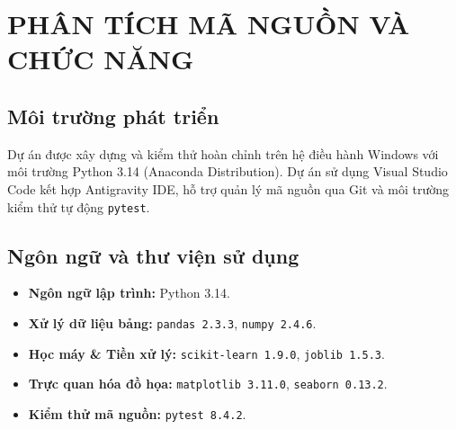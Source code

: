\chapter{PHÂN TÍCH MÃ NGUỒN VÀ CHỨC NĂNG}

\section{Môi trường phát triển}
Dự án được xây dựng và kiểm thử hoàn chỉnh trên hệ điều hành Windows với môi trường Python 3.14 (Anaconda Distribution). Dự án sử dụng Visual Studio Code kết hợp Antigravity IDE, hỗ trợ quản lý mã nguồn qua Git và môi trường kiểm thử tự động \texttt{pytest}.

\section{Ngôn ngữ và thư viện sử dụng}
\begin{itemize}
    \item \textbf{Ngôn ngữ lập trình:} Python 3.14.
    \item \textbf{Xử lý dữ liệu bảng:} \texttt{pandas 2.3.3}, \texttt{numpy 2.4.6}.
    \item \textbf{Học máy \& Tiền xử lý:} \texttt{scikit-learn 1.9.0}, \texttt{joblib 1.5.3}.
    \item \textbf{Trực quan hóa đồ họa:} \texttt{matplotlib 3.11.0}, \texttt{seaborn 0.13.2}.
    \item \textbf{Kiểm thử mã nguồn:} \texttt{pytest 8.4.2}.
\end{itemize}


